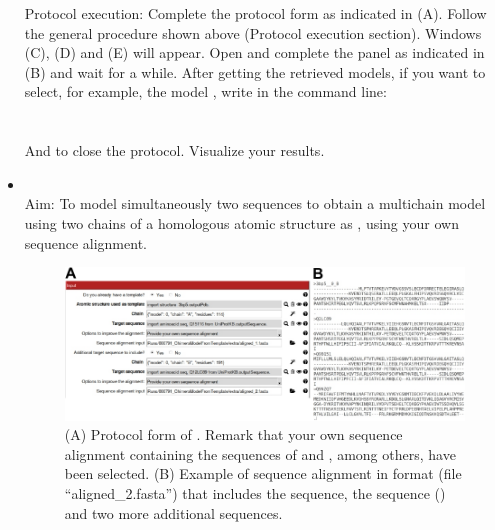 \begin{itemize}
                 Protocol execution: Complete the protocol form as indicated in  (A). Follow the general procedure shown above (Protocol execution section). Windows (C), (D) and (E) will appear. Open and complete the  panel as indicated in (B) and wait for a while. After getting the retrieved models, if you want to select, for example, the  model , write in the command line:\\
                \\
                \\
                And \chimera {} to close the protocol. Visualize your results.
                            
                \item {}\\
                Aim: To model simultaneously two  sequences to obtain a multichain model using two chains of a homologous atomic structure as , using your own sequence alignment.

 
                            \begin{figure}[H]
                            \centering 
                            \captionsetup{width=.9\linewidth} 
                            \includegraphics[width=.9\textwidth]{Images_appendix/Fig307.pdf}
                            \caption{(A) Protocol form of . Remark that your own sequence alignment containing the sequences of  and , among others, have been selected. (B) Example of sequence alignment in  format (file ``aligned\_2.fasta'') that includes the   sequence, the  sequence () and two more additional sequences.}  
                            \label{fig:app_protocol_seqHomology_4}
                            \end{figure}
                            

\end{itemize}
